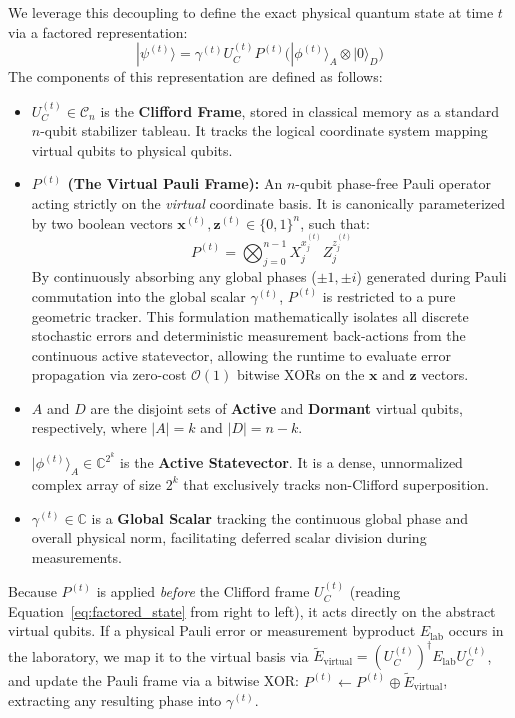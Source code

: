 \documentclass[11pt]{article}
\begin{document}
We leverage this decoupling to define the exact physical quantum state at time $t$ via a factored representation:
\begin{equation} \label{eq:factored_state}
    |\psi^{(t)}\rangle = \gamma^{(t)} U_C^{(t)} P^{(t)} \Big( |\phi^{(t)}\rangle_A \otimes |0\rangle_D \Big)
\end{equation}
The components of this representation are defined as follows:
\begin{itemize}
    \item $U_C^{(t)} \in \mathcal{C}_n$ is the \textbf{Clifford Frame}, stored in classical memory as a standard $n$-qubit stabilizer tableau. It tracks the logical coordinate system mapping virtual qubits to physical qubits.
    \item \textbf{$P^{(t)}$ (The Virtual Pauli Frame):} An $n$-qubit phase-free Pauli operator acting strictly on the \textit{virtual} coordinate basis. It is canonically parameterized by two boolean vectors $\mathbf{x}^{(t)}, \mathbf{z}^{(t)} \in \{0, 1\}^n$, such that:
\begin{equation}
    P^{(t)} = \bigotimes_{j=0}^{n-1} X_j^{x_j^{(t)}} Z_j^{z_j^{(t)}}
\end{equation}
By continuously absorbing any global phases ($\pm 1, \pm i$) generated during Pauli commutation into the global scalar $\gamma^{(t)}$, $P^{(t)}$ is restricted to a pure geometric tracker. This formulation mathematically isolates all discrete stochastic errors and deterministic measurement back-actions from the continuous active statevector, allowing the runtime to evaluate error propagation via zero-cost $\mathcal{O}(1)$ bitwise XORs on the $\mathbf{x}$ and $\mathbf{z}$ vectors.
    \item $A$ and $D$ are the disjoint sets of \textbf{Active} and \textbf{Dormant} virtual qubits, respectively, where $|A| = k$ and $|D| = n-k$.
    \item $|\phi^{(t)}\rangle_A \in \mathbb{C}^{2^k}$ is the \textbf{Active Statevector}. It is a dense, unnormalized complex array of size $2^k$ that exclusively tracks non-Clifford superposition.
    \item $\gamma^{(t)} \in \mathbb{C}$ is a \textbf{Global Scalar} tracking the continuous global phase and overall physical norm, facilitating deferred scalar division during measurements.
\end{itemize}

Because $P^{(t)}$ is applied \textit{before} the Clifford frame $U_C^{(t)}$ (reading Equation~\ref{eq:factored_state} from right to left), it acts directly on the abstract virtual qubits. If a physical Pauli error or measurement byproduct $E_{\text{lab}}$ occurs in the laboratory, we map it to the virtual basis via $\tilde{E}_{\text{virtual}} = (U_C^{(t)})^\dagger E_{\text{lab}} U_C^{(t)}$, and update the Pauli frame via a bitwise XOR: $P^{(t)} \leftarrow P^{(t)} \oplus \tilde{E}_{\text{virtual}}$, extracting any resulting phase into $\gamma^{(t)}$.
\end{document}
